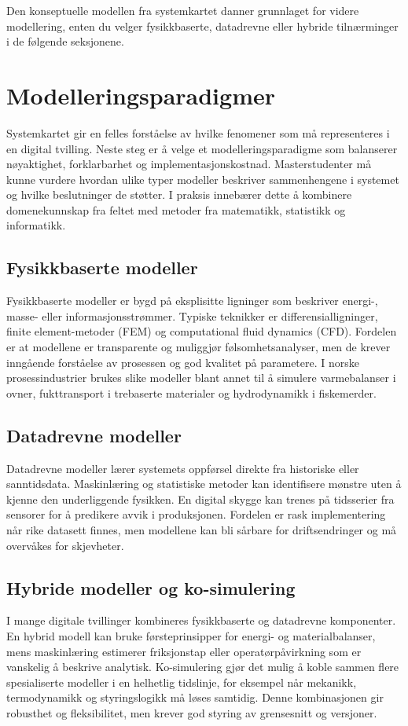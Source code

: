Den konseptuelle modellen fra systemkartet danner grunnlaget for videre modellering, enten du velger fysikkbaserte, datadrevne eller hybride tilnærminger i de følgende seksjonene.

\section{Modelleringsparadigmer}
Systemkartet gir en felles forståelse av hvilke fenomener som må representeres i en digital tvilling. Neste steg er å velge et
modelleringsparadigme som balanserer nøyaktighet, forklarbarhet og implementasjonskostnad. Masterstudenter må kunne vurdere
hvordan ulike typer modeller beskriver sammenhengene i systemet og hvilke beslutninger de støtter. I praksis innebærer dette å
kombinere domenekunnskap fra feltet med metoder fra matematikk, statistikk og informatikk.

\subsection{Fysikkbaserte modeller}
Fysikkbaserte modeller er bygd på eksplisitte ligninger som beskriver energi-, masse- eller informasjonsstrømmer. Typiske
teknikker er differensialligninger, finite element-metoder (FEM) og computational fluid dynamics (CFD). Fordelen er at
modellene er transparente og muliggjør følsomhetsanalyser, men de krever inngående forståelse av prosessen og god kvalitet på
parametere. I norske prosessindustrier brukes slike modeller blant annet til å simulere varmebalanser i ovner, fukttransport i
trebaserte materialer og hydrodynamikk i fiskemerder.

\subsection{Datadrevne modeller}
Datadrevne modeller lærer systemets oppførsel direkte fra historiske eller sanntidsdata. Maskinlæring og statistiske metoder
kan identifisere mønstre uten å kjenne den underliggende fysikken. En digital skygge kan trenes på tidsserier fra sensorer for
å predikere avvik i produksjonen. Fordelen er rask implementering når rike datasett finnes, men modellene kan bli sårbare for
driftsendringer og må overvåkes for skjevheter.

\subsection{Hybride modeller og ko-simulering}
I mange digitale tvillinger kombineres fysikkbaserte og datadrevne komponenter. En hybrid modell kan bruke førsteprinsipper for
energi- og materialbalanser, mens maskinlæring estimerer friksjonstap eller operatørpåvirkning som er vanskelig å beskrive
analytisk. Ko-simulering gjør det mulig å koble sammen flere spesialiserte modeller i en helhetlig tidslinje, for eksempel når
mekanikk, termodynamikk og styringslogikk må løses samtidig. Denne kombinasjonen gir robusthet og fleksibilitet, men krever
god styring av grensesnitt og versjoner.

